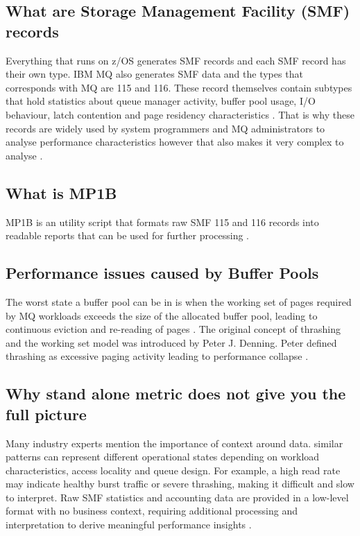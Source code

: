 \subsection{What are Storage Management Facility (SMF) records}%
Everything that runs on z/OS generates SMF records and each SMF record has their own type. IBM MQ also generates SMF data and the types that corresponds with MQ are 115 and 116. These record themselves contain subtypes that hold statistics about queue manager activity, buffer pool usage, I/O behaviour, latch contention and page residency characteristics \autocite{ibm2025_mq_smf}. That is why these records are widely used by system programmers and MQ administrators to analyse performance characteristics however that also makes it very complex to analyse \autocite{Vasquez2024}.

\subsection{What is MP1B}%
MP1B is an utility script that formats raw SMF 115 and 116 records into readable reports that can be used for further processing \autocite{ibm2025_mp1b}.

\subsection{Performance issues caused by Buffer Pools}%
The worst state a buffer pool can be in is when the working set of pages required by MQ workloads exceeds the size of the allocated buffer pool, leading to continuous eviction and re-reading of pages \autocite{ibm2025_mq_smf}. The original concept of thrashing and the working set model was introduced by Peter J. Denning. Peter defined thrashing as excessive paging activity leading to performance collapse \autocite{denning1968_working_set}.

\subsection{Why stand alone metric does not give you the full picture}%
Many industry experts mention the importance of context around data. similar patterns can represent different operational states depending on workload characteristics, access locality and queue design. For example, a high read rate may indicate healthy burst traffic or severe thrashing, making it difficult and slow to interpret. Raw SMF statistics and accounting data are provided in a low-level format with no business context, requiring additional processing and interpretation to derive meaningful performance insights \parencite{Klimaszewski2021}.




